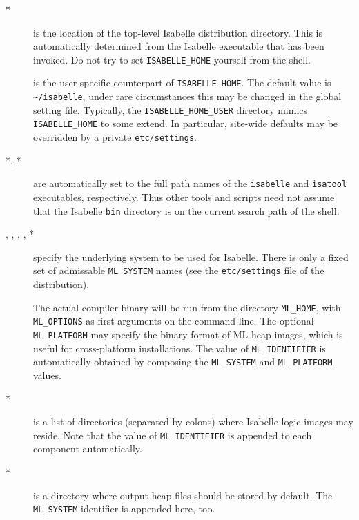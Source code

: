 \begin{description}
\item[*] is the location of the top-level Isabelle
  distribution directory. This is automatically determined from the Isabelle
  executable that has been invoked.  Do not try to set \texttt{ISABELLE_HOME}
  yourself from the shell.
  
\item[] is the user-specific counterpart of
  \texttt{ISABELLE_HOME}. The default value is \texttt{\~\relax/isabelle},
  under rare circumstances this may be changed in the global setting file.
  Typically, the \texttt{ISABELLE_HOME_USER} directory mimics
  \texttt{ISABELLE_HOME} to some extend. In particular, site-wide defaults may
  be overridden by a private \texttt{etc/settings}.
  
\item[*, *] are automatically set to the full
  path names of the \texttt{isabelle} and \texttt{isatool} executables,
  respectively.  Thus other tools and scripts need not assume that the
  Isabelle \texttt{bin} directory is on the current search path of the shell.
  
\item[, , ,
  , *] specify the underlying {\ML}
  system to be used for Isabelle.  There is only a fixed set of admissable
  \texttt{ML_SYSTEM} names (see the \texttt{etc/settings} file of the
  distribution).
  
  The actual compiler binary will be run from the directory \texttt{ML_HOME},
  with \texttt{ML_OPTIONS} as first arguments on the command line.  The
  optional \texttt{ML_PLATFORM} may specify the binary format of ML heap
  images, which is useful for cross-platform installations.  The value of
  \texttt{ML_IDENTIFIER} is automatically obtained by composing the
  \texttt{ML_SYSTEM} and \texttt{ML_PLATFORM} values.
  
\item[*] is a list of directories (separated by colons)
  where Isabelle logic images may reside. Note that the value of
  \texttt{ML_IDENTIFIER} is appended to each component automatically.
  
\item[*] is a directory where output heap files should
  be stored by default. The \texttt{ML_SYSTEM} identifier is appended here,
  too.
  

\end{description}
